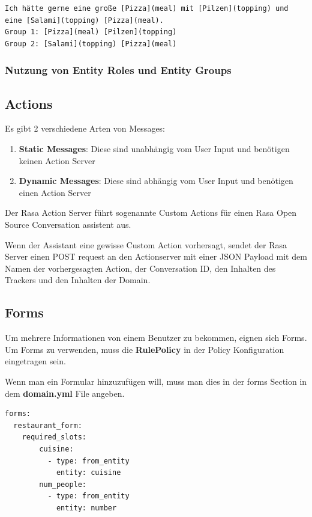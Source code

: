 \begin{lstlisting}[label={lst: Entity Groups Example 2}]
Ich hätte gerne eine große [Pizza](meal) mit [Pilzen](topping) und eine [Salami](topping) [Pizza](meal).
Group 1: [Pizza](meal) [Pilzen](topping)
Group 2: [Salami](topping) [Pizza](meal)
\end{lstlisting}


\subsubsection{Nutzung von Entity Roles und Entity Groups}

\subsection{Actions}

Es gibt 2 verschiedene Arten von Messages:

\begin{enumerate}
  \item \textbf{Static Messages}: Diese sind unabhängig vom User Input und benötigen keinen Action Server\cite{actionsVid}
  \item \textbf{Dynamic Messages}: Diese sind abhängig vom User Input und benötigen einen Action Server\cite{actionsVid}
\end{enumerate}

Der Rasa Action Server führt sogenannte Custom Actions für einen Rasa Open Source Conversation assistent aus.

Wenn der Assistant eine gewisse Custom Action vorhersagt, sendet der Rasa Server einen POST request an den Actionserver mit einer JSON Payload mit dem Namen der vorhergesagten Action, der Conversation ID, den Inhalten des Trackers und den Inhalten der Domain.\cite{actions}

\subsection{Forms}

Um mehrere Informationen von einem Benutzer zu bekommen, eignen sich Forms.
Um Forms zu verwenden, muss die \textbf{RulePolicy} in der Policy Konfiguration eingetragen sein.\cite{forms}

Wenn man ein Formular hinzuzufügen will, muss man dies in der forms Section in dem \textbf{domain.yml} File angeben.

\begin{lstlisting}[label={lst: Forms Example}]
forms:
  restaurant_form:
    required_slots:
        cuisine:
          - type: from_entity
            entity: cuisine
        num_people:
          - type: from_entity
            entity: number
\end{lstlisting}


